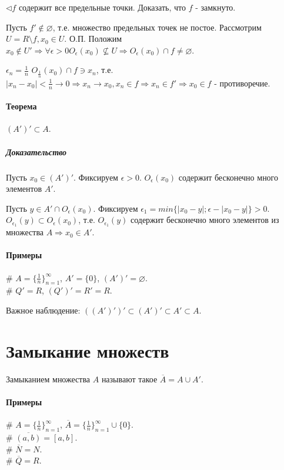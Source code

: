 \documentclass[10pt]{article}
\newcommand{\ol}[1]{\overline{#1}}
\begin{document}
				$\lhd f$ содержит все предельные точки. Доказать, что $f$ - замкнуто.
				
				Пусть $f' \notin \varnothing$, т.е. множество предельных точек не постое. Рассмотрим $U = R \setminus f, x_0 \in U$.	
				О.П. Положим $x_0 \notin U' \Rightarrow \forall \epsilon > 0 O_\epsilon(x_0) \nsubseteq U \Rightarrow O_\epsilon (x_0) \cap f \neq \varnothing$.
				
				$\epsilon_n = \frac{1}{n}$ $O_\frac{1}{n} (x_0) \cap f \ni x_n$, т.е. $|x_n - x_0| < \frac{1}{n} \to 0 \Rightarrow x_n \to x_0, x_n \in f \Rightarrow x_n \in f' \Rightarrow x_0 \in f$ - противоречие.
				
			\paragraph{Теорема} $(A')' \subset A$.
			\subparagraph{Доказательство}
				Пусть $x_0 \in (A')'$. Фиксируем $\epsilon > 0$. $O_\epsilon(x_0)$ содержит бесконечно много элементов $A'$. 
				
				Пусть $y \in A' \cap O_\epsilon(x_0)$. Фиксируем $\epsilon_1 = min \{|x_0 - y|; \epsilon - |x_0 - y|\} > 0$. $O_{\epsilon_1}(y) \subset O_\epsilon(x_0)$, т.е. $O_{\epsilon_1}(y)$ содержит бесконечно много элементов из множества $A \Rightarrow x_0 \in A'$. 
				
			\paragraph{Примеры}
			\# $A = \{\frac{1}{n}\}_{n=1}^\infty$, $A' = \{0\}$, $(A')' = \varnothing$.\\
			\# $Q' = R$, $(Q')' = R' = R$. 
			
			Важное наблюдение: $((A')')' \subset (A')' \subset A' \subset A$.
		\section{Замыкание множеств}
			Замыканием множества $A$ называют такое $\ol{A} = A \cup A'$.
			
			\paragraph{Примеры} \# $A = \{\frac{1}{n}\}_{n=1}^\infty$, $\ol{A} = \{\frac{1}{n}\}_{n=1}^\infty \cup \{0\}$.\\
			\# $\ol{(a, b)} = [a, b]$.\\
			\# $\ol{N} = N$.\\
			\# $\ol{Q} = R$.
			
\end{document}
